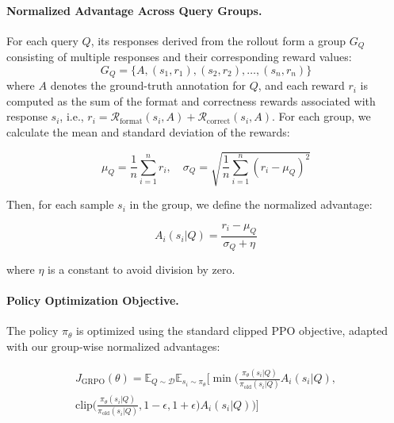 \paragraph{Normalized Advantage Across Query Groups.}
For each query \( Q \), its responses derived from the rollout form a group \( G_Q \) consisting of multiple responses and their corresponding reward values: 
\[
G_Q = \{ A, (s_1, r_1), (s_2, r_2), \ldots, (s_n, r_n) \}
\]
where \( A \) denotes the ground-truth annotation for \( Q \), and each reward \( r_i \) is computed as the sum of the format and correctness rewards associated with response \( s_i \), i.e., \( r_i = \mathcal{R}_{\text{format}}(s_i, A) + \mathcal{R}_{\text{correct}}(s_i, A) \). For each group, we calculate the mean and standard deviation of the rewards:

\begin{small}
\begin{equation*}
    \mu_Q = \frac{1}{n} \sum_{i=1}^n r_i, \quad 
    \sigma_Q = \sqrt{\frac{1}{n} \sum_{i=1}^n (r_i - \mu_Q)^2}
\end{equation*}
\end{small}

Then, for each sample \( s_i \) in the group, we define the normalized advantage:

\begin{small}
\begin{equation*}
    A_i(s_i | Q) = \frac{r_i - \mu_Q}{\sigma_Q + \eta}
\end{equation*}
\end{small}
where \( \eta \) is a constant to avoid division by zero.

\paragraph{Policy Optimization Objective.}
The policy \( \pi_\theta \) is optimized using the standard clipped PPO objective, adapted with our group-wise normalized advantages:

\begin{small}
\begin{equation*}
\begin{split}
J_{\text{GRPO}}(\theta) = \mathbb{E}_{Q \sim \mathcal{D}} \mathbb{E}_{s_i \sim \pi_\theta} \Big[ 
\min\Big( \frac{\pi_\theta(s_i|Q)}{\pi_{\text{old}}(s_i|Q)} A_i(s_i|Q), \\
\text{clip}\big( \frac{\pi_\theta(s_i|Q)}{\pi_{\text{old}}(s_i|Q)}, 1-\epsilon, 1+\epsilon \big) A_i(s_i|Q) 
\Big) \Big]
\end{split}
\end{equation*}
\end{small}

